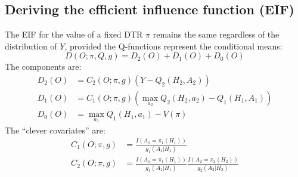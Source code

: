 \documentclass{article}
\begin{document}
\subsection{Deriving the efficient influence function (EIF)}
The EIF for the value of a fixed DTR $\pi$ remains the same regardless of the distribution of $Y$, provided the Q-functions represent the conditional means:
$$ D(O; \pi, Q, g) = D_2(O) + D_1(O) + D_0(O) $$
The components are:
\[
	\begin{aligned}
		D_2(O) & = C_2(O; \pi, g) \left(Y - Q_2(H_2, A_2)\right)                       \\
		D_1(O) & = C_1(O; \pi, g) \left(\max_{a_2}Q_2(H_2, a_2) - Q_1(H_1, A_1)\right) \\
		D_0(O) & = \max_{a_1}Q_1(H_1, a_1) - V(\pi)
	\end{aligned}
\]
The ``clever covariates'' are:
\[
	\begin{aligned}
		C_1(O; \pi, g) & = \frac{I(A_1 = \pi_1(H_1))}{g_1(A_1|H_1)}                                          \\
		C_2(O; \pi, g) & = \frac{I(A_1 = \pi_1(H_1))}{g_1(A_1|H_1)} \frac{I(A_2 = \pi_2(H_2))}{g_2(A_2|H_2)}
	\end{aligned}
\]
\end{document}
